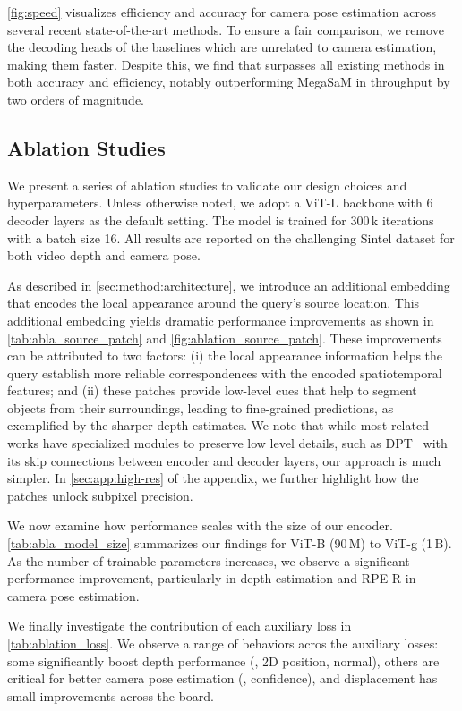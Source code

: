 \cref{fig:speed} visualizes efficiency and accuracy for camera pose estimation across several recent state-of-the-art methods.
To ensure a fair comparison, we remove the decoding heads of the baselines which are unrelated to camera estimation, making them faster.
Despite this, we find that \name surpasses all existing methods in both accuracy and efficiency, notably outperforming MegaSaM in throughput by two orders of magnitude.

\subsection{Ablation Studies}
\label{sec:exp:ablations}

We present a series of ablation studies to validate our design choices and hyperparameters.
Unless otherwise noted, we adopt a ViT-L backbone with $6$ decoder layers as the default setting.
The model is trained for 300\,k iterations with a batch size 16.
All results are reported on the challenging Sintel dataset for both video depth and camera pose.






As described in \cref{sec:method:architecture}, we introduce an additional embedding that encodes the local appearance around the query's source location.
This additional embedding yields dramatic performance improvements as shown in \cref{tab:abla_source_patch} and \cref{fig:ablation_source_patch}. These improvements can be attributed to two factors: (i) the local appearance information helps the query establish more reliable correspondences with the encoded spatiotemporal features; and (ii) these patches provide low-level cues that help to segment objects from their surroundings, leading to fine-grained predictions, as exemplified by the sharper depth estimates. We note that while most related works have specialized modules to preserve low level details, such as DPT~\cite{Ranftl2021} with its skip connections between encoder and decoder layers, our approach is much simpler.
In \cref{sec:app:high-res} of the appendix, we further highlight how the patches unlock subpixel precision.


We now examine how performance scales with the size of our encoder.
\cref{tab:abla_model_size} summarizes our findings for ViT-B (90\,M) to ViT-g (1\,B).
As the number of trainable parameters increases, we observe a significant performance improvement, particularly in depth estimation and RPE-R in camera pose estimation.




We finally investigate the contribution of each auxiliary loss in \cref{tab:ablation_loss}.
We observe a range of behaviors acros the auxiliary losses:
some significantly boost depth performance (\eg, 2D position, normal), others are critical for better camera pose estimation (\eg, confidence), and displacement has small improvements across the board.
